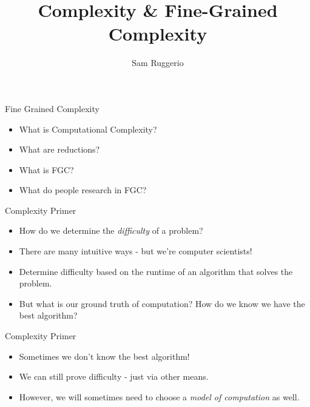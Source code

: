 \documentclass[aspectratio=169]{beamer}
\title{Complexity \& Fine-Grained Complexity}
\author{Sam Ruggerio}
\date{}
\begin{document}

\begin{frame}
\titlepage
\end{frame}


\begin{frame}{Fine Grained Complexity}
    \begin{itemize}
        \item What is Computational Complexity?
        \item What are reductions?
        \item What is FGC?
        \item What do people research in FGC?
    \end{itemize}
\end{frame}

\begin{frame}{Complexity Primer}
    \begin{itemize}
        \item How do we determine the \textit{difficulty} of a problem? \pause
        \item There are many intuitive ways - but we're computer scientists! \pause
        \item Determine difficulty based on the runtime of an algorithm that solves the problem. \pause
        \item But what is our ground truth of computation? How do we know we have the best algorithm?
    \end{itemize}
\end{frame}

\begin{frame}{Complexity Primer}
    \begin{itemize}
        \item Sometimes we don't know the best algorithm! \pause
        \item We can still prove difficulty - just via other means. \pause
        \item However, we will sometimes need to choose a \textit{model of computation} as well.
    \end{itemize}
\end{frame}
\end{document}
